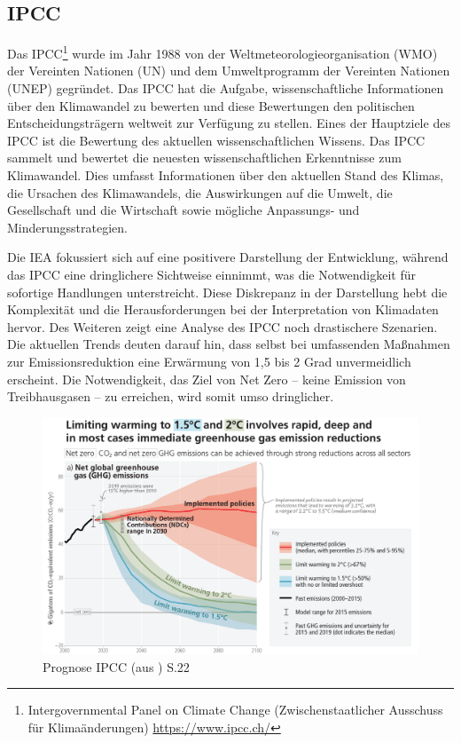 \documentclass{article}
\begin{document}
 \subsection*{IPCC}
Das IPCC\footnote{%
         Intergovernmental Panel on Climate Change (Zwischenstaatlicher Ausschuss für Klimaänderungen)
				\href{https://www.ipcc.ch/}{https://www.ipcc.ch/}} 
wurde im Jahr 1988 von der Weltmeteorologieorganisation (WMO) der Vereinten Nationen (UN) und dem Umweltprogramm der Vereinten Nationen (UNEP) gegründet. Das IPCC hat die Aufgabe, wissenschaftliche Informationen über den Klimawandel zu bewerten und diese Bewertungen den politischen Entscheidungsträgern weltweit zur Verfügung zu stellen.
Eines der Hauptziele des IPCC ist die 
Bewertung des aktuellen wissenschaftlichen Wissens. Das IPCC sammelt und bewertet die neuesten wissenschaftlichen Erkenntnisse zum Klimawandel. Dies umfasst Informationen über den aktuellen Stand des Klimas, die Ursachen des Klimawandels, die Auswirkungen auf die Umwelt, die Gesellschaft und die Wirtschaft sowie mögliche Anpassungs- und Minderungsstrategien.



Die IEA fokussiert sich auf eine positivere Darstellung der Entwicklung, während das IPCC eine  dringlichere Sichtweise einnimmt, was die Notwendigkeit für sofortige Handlungen unterstreicht. Diese Diskrepanz in der Darstellung hebt die Komplexität und die Herausforderungen bei der Interpretation von Klimadaten hervor.
Des Weiteren zeigt eine Analyse des IPCC noch drastischere Szenarien. Die aktuellen Trends deuten darauf hin, dass selbst bei umfassenden Maßnahmen zur Emissionsreduktion eine Erwärmung von 1,5 bis 2 Grad unvermeidlich erscheint. Die Notwendigkeit, das Ziel von Net Zero – keine Emission von Treibhausgasen – zu erreichen, wird somit umso dringlicher.

\begin{figure}[h]
	\centering
		\includegraphics[width=1.00\textwidth]{../Figures/IPCC_AR6_SYR_SPM_Figure5.png}
	\caption{Prognose IPCC (aus \cite{lee_ipcc_2023}) S.22}
	\label{fig:IPCC_AR6_SYR_SPM}
\end{figure}
\end{document}
